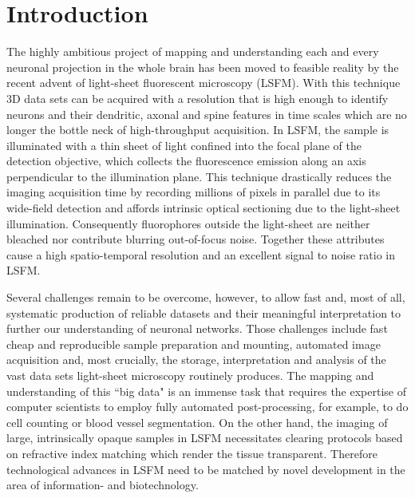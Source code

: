 \documentclass[12pt]{spieman}  %
\begin{document}
\section{Introduction}%
\label{sect:intro}  

The highly ambitious project of mapping and understanding each and every neuronal projection in the whole brain has been moved to feasible reality by the recent advent of light-sheet fluorescent microscopy (LSFM). With this technique 3D data sets can be acquired with a resolution that is high enough to identify neurons and their dendritic, axonal and spine features in time scales which are no longer the bottle neck of high-throughput acquisition. In LSFM, the sample is illuminated with a thin sheet of light confined into the focal plane of the detection objective, which collects the fluorescence emission along an axis perpendicular to the illumination plane\cite{Huisken2009}. This technique drastically reduces the imaging acquisition time by recording millions of pixels in parallel due to its wide-field detection and affords intrinsic optical sectioning due to the light-sheet illumination. Consequently fluorophores outside the light-sheet are neither bleached nor contribute blurring out-of-focus noise. Together these attributes cause a high spatio-temporal resolution and an excellent signal to noise ratio in LSFM. 

Several challenges remain to be overcome, however, to allow fast and, most of all, systematic production of reliable datasets and their meaningful interpretation to further our understanding of neuronal networks. Those challenges include fast cheap and reproducible sample preparation and mounting, automated image acquisition and, most crucially, the storage, interpretation and analysis of the vast data sets light-sheet microscopy routinely produces. The mapping and understanding of this ``big data" is an immense task that requires the expertise of computer scientists to employ fully automated post-processing, for example, to do cell counting or blood vessel segmentation. On the other hand, the imaging of large, intrinsically opaque samples in LSFM necessitates clearing protocols based on refractive index matching which render the tissue transparent. Therefore technological advances in LSFM need to be matched by novel development in the area of information- and biotechnology.
\end{document}
